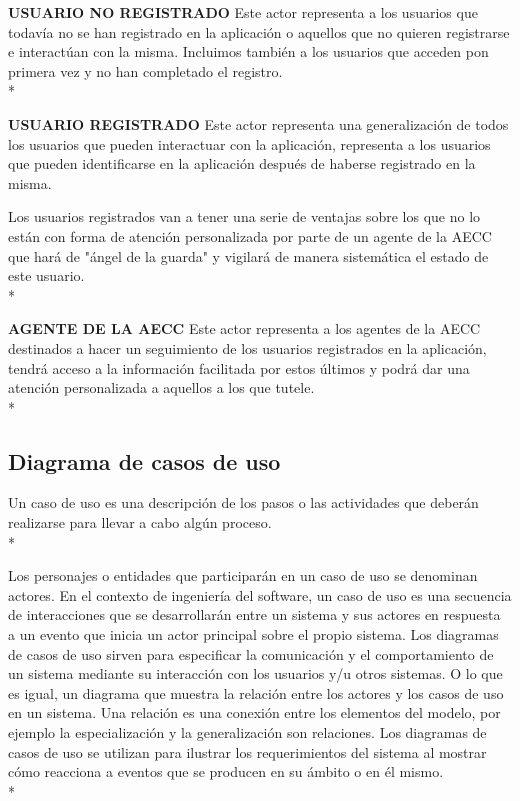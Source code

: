 \documentclass[../pfc.tex]{subfiles}
\begin{document}
	\textbf{USUARIO NO REGISTRADO}
	Este actor representa a los usuarios que todavía no se han registrado en la aplicación o aquellos que no quieren registrarse e interactúan con la misma. Incluimos también a los usuarios que acceden pon primera vez y no han completado el registro.\\*
	
	\textbf{USUARIO REGISTRADO}
	Este actor representa una generalización de todos los usuarios que pueden interactuar con la aplicación, representa a los usuarios que pueden identificarse en la aplicación después de haberse registrado en la misma.
	
	Los usuarios registrados van a tener una serie de ventajas sobre los que no lo están con forma de atención personalizada por parte de un agente de la AECC que hará de "ángel de la guarda" y vigilará de manera sistemática el estado de este usuario.\\*
	
	\textbf{AGENTE DE LA AECC}
	Este actor representa a los agentes de la AECC destinados a hacer un seguimiento de los usuarios registrados en la aplicación, tendrá acceso a la información facilitada por estos últimos y podrá dar una atención personalizada a aquellos a los que tutele.\\*
		
	\subsection{Diagrama de casos de uso }
		
	Un caso de uso es una descripción de los pasos o las actividades que deberán realizarse para llevar a cabo algún proceso.\\*
	
	Los personajes o entidades que participarán en un caso de uso se denominan actores. En el contexto de ingeniería del software, un caso de uso es una secuencia de interacciones que se desarrollarán entre un sistema y sus actores en respuesta a un evento que inicia un actor principal sobre el propio sistema. Los diagramas de casos de uso sirven para especificar la comunicación y el comportamiento de un sistema mediante su interacción con los usuarios y/u otros sistemas. O lo que es igual, un diagrama que muestra la relación entre los actores y los casos de uso en un sistema. Una relación es una conexión entre los elementos del modelo, por ejemplo la especialización y la generalización son relaciones. Los diagramas de casos de uso se utilizan para ilustrar los requerimientos del sistema al mostrar cómo reacciona a eventos que se producen en su ámbito o en él mismo.\\*
	
\end{document}
